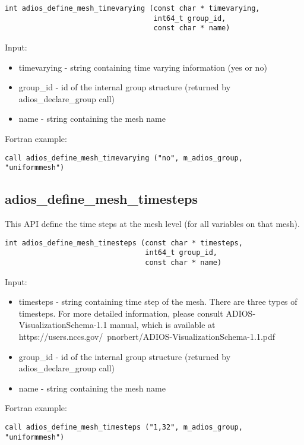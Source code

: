 \begin{lstlisting}[alsolanguage=C,caption={},label={}]
int adios_define_mesh_timevarying (const char * timevarying, 
                                   int64_t group_id, 
                                   const char * name)
\end{lstlisting}

Input:
\begin{itemize}
\item timevarying - string containing time varying information (yes or no)
\item group\_id - id of the internal group structure (returned by adios\_declare\_group call)
\item name - string containing the mesh name
\end{itemize}

Fortran example:
\begin{lstlisting}[alsolanguage=Fortran,caption={},label={}]
call adios_define_mesh_timevarying ("no", m_adios_group, "uniformmesh")
\end{lstlisting}


\subsection{adios\_define\_mesh\_timesteps}
This API define the time steps at the mesh level (for all variables on that mesh).

\begin{lstlisting}[alsolanguage=C,caption={},label={}]
int adios_define_mesh_timesteps (const char * timesteps, 
                                 int64_t group_id, 
                                 const char * name)
\end{lstlisting}

Input:
\begin{itemize}
\item timesteps - string containing time step of the mesh. There are three types of
timesteps. For more detailed information, please consult ADIOS-VisualizationSchema-1.1 manual,
which is available at https://users.nccs.gov/~pnorbert/ADIOS-VisualizationSchema-1.1.pdf
\item group\_id - id of the internal group structure (returned by adios\_declare\_group call)
\item name - string containing the mesh name
\end{itemize}

Fortran example:
\begin{lstlisting}[alsolanguage=Fortran,caption={},label={}]
call adios_define_mesh_timesteps ("1,32", m_adios_group, "uniformmesh")
\end{lstlisting}


